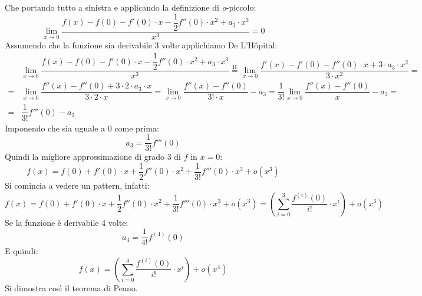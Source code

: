 Che portando tutto a sinistra e applicando la definizione di \textit{o}-piccolo:
\begin{equation*}
	\lim_{x \to 0} \dfrac{f(x) - f(0) - f'(0) \cdot x - \dfrac{1}{2} f''(0) \cdot x^2 + a_3 \cdot x^3}{x^3} = 0
\end{equation*}
Assumendo che la funzione sia derivabile 3 volte applichiamo De L'Hôpital:
\begin{align*}
	&\lim_{x \to 0} \dfrac{f(x) - f(0) - f'(0) \cdot x - \dfrac{1}{2} f''(0) \cdot x^2 + a_3 \cdot x^3}{x^3} \stackrel{\text{H}}{=} \lim_{x \to 0} \dfrac{f'(x) - f'(0) - f''(0) \cdot x + 3 \cdot a_3 \cdot x^2}{3 \cdot x^2} = \\[10pt]
	= &\lim_{x \to 0} \dfrac{f''(x) - f''(0) + 3 \cdot 2 \cdot a_3 \cdot x}{3 \cdot 2 \cdot x} = \lim_{x \to 0} \dfrac{f''(x) - f''(0)}{3! \cdot x} - a_3 = \dfrac{1}{3!} \lim_{x \to 0} \dfrac{f''(x) - f''(0)}{x} - a_3 = \\[10pt]
	= &\dfrac{1}{3!} f'''(0) - a_3
\end{align*}
Imponendo che sia uguale a 0 come prima:
\begin{equation*}
	a_3 = \dfrac{1}{3!} f'''(0)
\end{equation*}
Quindi la migliore approssimazione di grado 3 di $f$ in $x = 0$:
\begin{equation*}
	f(x) = f(0) + f'(0) \cdot x + \dfrac{1}{2} f''(0) \cdot x^2 + \dfrac{1}{3!} f'''(0) \cdot x^3 + o(x^3)
\end{equation*}
Si comincia a vedere un pattern, infatti:
\begin{equation*}
	f(x) = f(0) + f'(0) \cdot x + \dfrac{1}{2} f''(0) \cdot x^2 + \dfrac{1}{3!} f'''(0) \cdot x^3 + o(x^3) = \left( \sum \limits_{i = 0}^3 \dfrac{f^{(i)}(0)}{i!} \cdot x^i \right) + o(x^3)
\end{equation*}
Se la funzione è derivabile 4 volte:
\begin{equation*}
	a_4 = \dfrac{1}{4!} f^{(4)}(0)
\end{equation*}
E quindi:
\begin{equation*}
	f(x) = \left( \sum \limits_{i = 0}^4 \dfrac{f^{(i)}(0)}{i!} \cdot x^i \right) + o(x^4)
\end{equation*}
Si dimostra così il teorema di Peano.


